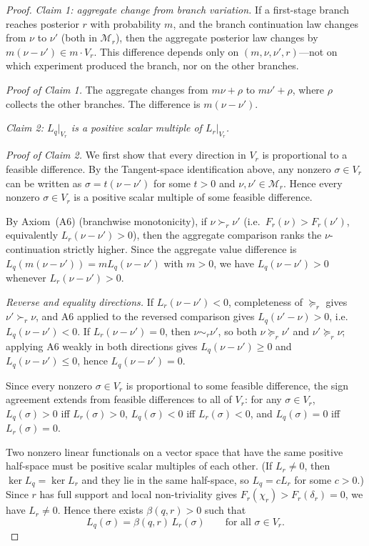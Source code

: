 \documentclass[11pt,a4paper]{article}
\theoremstyle{definition}
\newcommand{\1}{\mathbf 1}
\begin{document}
\begin{proof}
\emph{Claim 1: aggregate change from branch variation.}  If a first-stage branch reaches posterior $r$ with probability
$m$, and the branch continuation law changes from $\nu$ to $\nu'$ (both in $\mathcal M_r$), then the aggregate posterior
law changes by $m(\nu-\nu')\in m\cdot V_r$.  This difference depends only on $(m,\nu,\nu',r)$---not on which experiment
produced the branch, nor on the other branches.

\emph{Proof of Claim 1.}  The aggregate changes from $m\nu+\rho$ to $m\nu'+\rho$, where $\rho$ collects the other
branches.  The difference is $m(\nu-\nu')$.

\emph{Claim 2: $L_q|_{V_r}$ is a positive scalar multiple of $L_r|_{V_r}$.}

\emph{Proof of Claim 2.}  We first show that every direction in $V_r$ is proportional to a feasible difference.
By the Tangent-space identification above, any nonzero $\sigma\in V_r$ can be written as
$\sigma=t(\nu-\nu')$ for some $t>0$ and $\nu,\nu'\in\mathcal M_r$.  Hence every nonzero $\sigma\in V_r$ is a positive
scalar multiple of some feasible difference.

By Axiom~\textup{(A6)} (branchwise monotonicity), if $\nu\succ_r\nu'$ (i.e.\ $F_r(\nu)>F_r(\nu')$, equivalently
$L_r(\nu-\nu')>0$), then the aggregate comparison ranks the $\nu$-continuation strictly higher.  Since the aggregate
value difference is $L_q(m(\nu-\nu'))=mL_q(\nu-\nu')$ with $m>0$, we have $L_q(\nu-\nu')>0$ whenever $L_r(\nu-\nu')>0$.

\emph{Reverse and equality directions.}  If $L_r(\nu-\nu')<0$, completeness of $\succeq_r$ gives $\nu'\succ_r\nu$, and
A6 applied to the reversed comparison gives $L_q(\nu'-\nu)>0$, i.e.\ $L_q(\nu-\nu')<0$.  If $L_r(\nu-\nu')=0$, then
$\nu\sim_r\nu'$, so both $\nu\succeq_r\nu'$ and $\nu'\succeq_r\nu$; applying A6 weakly in both directions gives
$L_q(\nu-\nu')\ge 0$ and $L_q(\nu-\nu')\le 0$, hence $L_q(\nu-\nu')=0$.

Since every nonzero $\sigma\in V_r$ is proportional to some feasible difference, the sign agreement extends from
feasible differences to all of $V_r$: for any $\sigma\in V_r$, $L_q(\sigma)>0$ iff $L_r(\sigma)>0$, $L_q(\sigma)<0$
iff $L_r(\sigma)<0$, and $L_q(\sigma)=0$ iff $L_r(\sigma)=0$.

Two nonzero linear functionals on a vector space that have the same positive half-space must be positive scalar
multiples of each other.  (If $L_r\ne 0$, then $\ker L_q=\ker L_r$ and they lie in the same half-space, so $L_q=cL_r$
for some $c>0$.)  Since $r$ has full support and local non-triviality gives $F_r(\chi_r)>F_r(\delta_r)=0$, we have
$L_r\ne 0$.  Hence there exists $\beta(q,r)>0$ such that
\[
L_q(\sigma)=\beta(q,r)\,L_r(\sigma)
\qquad\text{for all }\sigma\in V_r.
\]


\end{proof}
\end{document}
